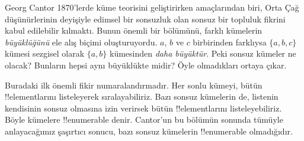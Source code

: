 \documentclass[../../../include/open-logic-section]{subfiles}
\begin{document}


Georg Cantor 1870'lerde küme teorisini geliştirirken amaçlarından biri, Orta
Çağ düşünürlerinin deyişiyle edimsel bir sonsuzluk olan sonsuz bir topluluk
fikrini kabul edilebilir kılmaktı. Bunun önemli bir bölümünü, farklı kümelerin
\emph{büyüklüğünü} ele alış biçimi oluşturuyordu. $a$, $b$ ve $c$ birbirinden
farklıysa $\{a, b, c\}$ kümesi sezgisel olarak $\{a, b\}$ kümesinden
\emph{daha büyüktür}. Peki sonsuz kümeler ne olacak? Bunların hepsi aynı
büyüklükte midir? Öyle olmadıkları ortaya çıkar.

Buradaki ilk önemli fikir numaralandırmadır. Her sonlu kümeyi, bütün
!!{element}larını listeleyerek sıralayabiliriz. Bazı sonsuz kümelerin de,
listenin kendisinin sonsuz olmasına izin verirsek bütün !!{element}larını
listeleyebiliriz. Böyle kümelere !!{enumerable} denir. Cantor'un bu bölümün
sonunda tümüyle anlayacağımız şaşırtıcı sonucu, bazı sonsuz kümelerin
!!{enumerable} olmadığıdır.
\end{document}
